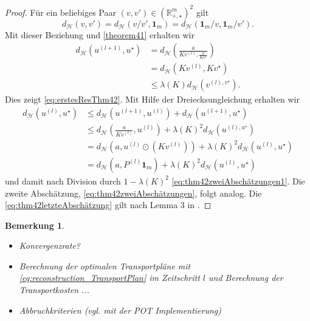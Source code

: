 \documentclass[11pt,a4paper]{article}
\newtheorem{remark}[theorem]{Bemerkung}
\numberwithin{equation}{section}
\begin{document}
	\begin{proof}
		Für ein beliebiges Paar $(v,v') \in (\mathbb{R}_{+,\star}^m)^2$ gilt
		\begin{equation*}
		d_\mathcal{H} (v,v') = d_\mathcal{H}(v/v',\boldsymbol{1}_m) = d_\mathcal{H}(\boldsymbol{1}_m/v,\boldsymbol{1}_m/v').
		\end{equation*}
		Mit dieser Beziehung und \autoref{theorem41} erhalten wir
		\begin{align*}
		d_\mathcal{H}(u^{(l+1)}, u^\star) &= d_\mathcal{H}\left(\frac{a}{Kv^{(l)},\frac{a}{Kv^\star}}\right)\\
		&=d_\mathcal{H}(Kv^{(l)}, Kv^\star) \\
		&\leq \lambda (K)d_\mathcal{H}(v^{(l),v^\star}).
		\end{align*}
		Dies zeigt \autoref{eq:erstesResThm42}. Mit Hilfe der Dreiecksungleichung erhalten wir
		\begin{align*}
		d_\mathcal{H}(u^{(l)}, u^\star) &\leq d_\mathcal{H}(u^{(l+1)},u^{(l)}) + d_\mathcal{H}(u^{(l+1)},u^\star)\\
		& \leq d_\mathcal{H}\left(\frac{a}{Kv^{(l)}}, u^{(l)}\right) + \lambda (K)^2 d_\mathcal{H}(u^{(l),u^\star})\\
		&= d_\mathcal{H}\left(a, u^{(l)} \odot (Kv^{(l)})\right) + \lambda (K)^2 d_\mathcal{H}(u^{(l)},u^\star)\\
		&= d_\mathcal{H}\left(a, P^{(l)}\boldsymbol{1}_m \right) + \lambda (K)^2 d_\mathcal{H}(u^{(l)},u^\star)
		\end{align*}
		und damit nach Division durch $1-\lambda(K)^2$  \autoref{eq:thm42zweiAbschätzungen1}. Die zweite Abschätzung, \autoref{eq:thm42zweiAbschätzungen}, folgt analog. 
		Die \autoref{eq:thm42letzteAbschätzung} gilt nach Lemma 3 in \cite{franklin_sinkhorn_convergence}.
	\end{proof}
	
	\begin{remark}
		\leavevmode 
		\begin{itemize}
			\item Konvergenzrate?
			\item Berechnung der optimalen Transportpläne mit \autoref{eq:reconstruction_TransportPlan} im Zeitschritt $l$ und Berechnung der Transportkosten ...
			\item Abbruchkriterien (vgl. mit der POT Implementierung)
		\end{itemize}
	\end{remark}
	
\end{document}
